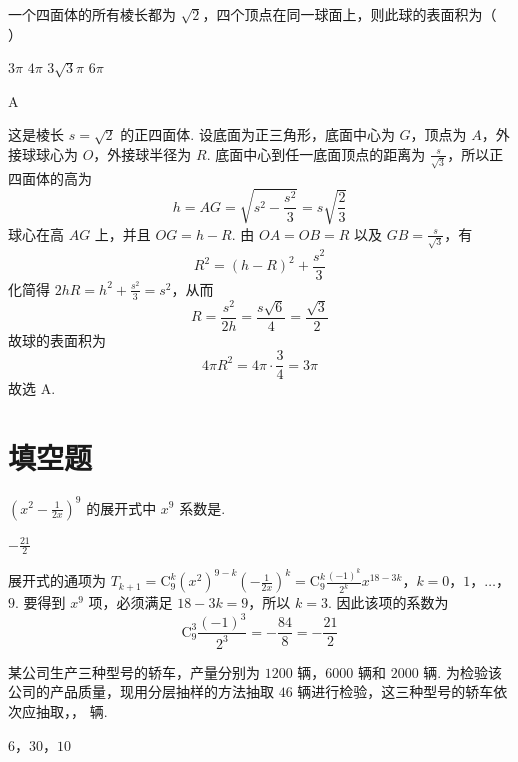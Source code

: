 \begin{problem}
一个四面体的所有棱长都为 \(\sqrt{2}\)，四个顶点在同一球面上，则此球的表面积为（\(\quad\)）

\choices
    {\(3\pi\)}
    {\(4\pi\)}
    {\(3\sqrt{3}\pi\)}
    {\(6\pi\)}
\end{problem}

\begin{answer}
A
\end{answer}

\begin{solution}
这是棱长 \(s=\sqrt2\) 的正四面体. 设底面为正三角形，底面中心为 \(G\)，顶点为 \(A\)，外接球球心为 \(O\)，外接球半径为 \(R\). 底面中心到任一底面顶点的距离为 \(\frac{s}{\sqrt3}\)，所以正四面体的高为
\[
h=AG=\sqrt{s^2-\frac{s^2}{3}}=s\sqrt{\frac23}
\]
球心在高 \(AG\) 上，并且 \(OG=h-R\). 由 \(OA=OB=R\) 以及 \(GB=\frac{s}{\sqrt3}\)，有
\[
R^2=(h-R)^2+\frac{s^2}{3}
\]
化简得 \(2hR=h^2+\frac{s^2}{3}=s^2\)，从而
\[
R=\frac{s^2}{2h}=\frac{s\sqrt6}{4}=\frac{\sqrt3}{2}
\]
故球的表面积为
\[
4\pi R^2=4\pi\cdot\frac34=3\pi
\]
故选 A.
\end{solution}

\section{填空题}
\begin{problem}
\(\left(x^{2} - \frac{1}{2x}\right)^{9}\) 的展开式中 \(x^{9}\) 系数是\fillinblank{}.
\end{problem}

\begin{answer}
\(-\frac{21}{2}\)
\end{answer}

\begin{solution}
展开式的通项为
\(T_{k+1}=\mathrm C_9^k(x^2)^{9-k}\left(-\frac{1}{2x}\right)^k =\mathrm C_9^k\frac{(-1)^k}{2^k}x^{18-3k}\)，\(k=0\)，\(1\)，\(\ldots\)，\(9\).
要得到 \(x^9\) 项，必须满足 \(18-3k=9\)，所以 \(k=3\). 因此该项的系数为
\[
\mathrm C_9^3\frac{(-1)^3}{2^3}
=-\frac{84}{8}
=-\frac{21}{2}
\]
\end{solution}

\begin{problem}
某公司生产三种型号的轿车，产量分别为 \(1200\) 辆，\(6000\) 辆和 \(2000\) 辆. 为检验该公司的产品质量，现用分层抽样的方法抽取 \(46\) 辆进行检验，这三种型号的轿车依次应抽取\fillinblank{}，\fillinblank{}，\fillinblank{} 辆.
\end{problem}

\begin{answer}
\(6\)，\(30\)，\(10\)
\end{answer}

